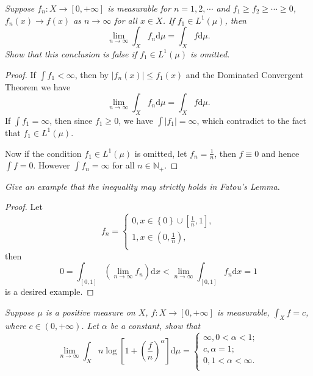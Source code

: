 \begin{problem}\em
Suppose $f_n:X\to [0,+\infty]$ is measurable for $n=1,2,\cdots$ and $f_1\ge f_2\ge\cdots\ge 0$, $f_n(x)\to f(x)$ as $n\to\infty$ for all $x\in X$. If $f_1\in L^1(\mu)$, then 
$$\lim_{n\to\infty}\int_Xf_n\mathrm{d}\mu=\int_Xf\mathrm{d}\mu.$$
Show that this conclusion is false if $f_1\in L^1(\mu)$ is omitted.
\end{problem}
\begin{proof}
If $\int f_1<\infty$, then by $|f_n(x)|\le f_1(x)$ and the Dominated Convergent Theorem we have 
$$\lim_{n\to\infty}\int_Xf_n\mathrm{d}\mu=\int_Xf\mathrm{d}\mu.$$
If $\int f_1=\infty$, then since $f_1\ge 0$, we have $\int|f_1|=\infty$, which contradict to the fact that $f_1\in L^1(\mu)$.\par
Now if the condition $f_1\in L^1(\mu)$ is omitted, let $f_n=\frac{1}{n}$, then $f\equiv 0$ and hence $\int f=0$. However $\int f_n=\infty$ for all $n\in\mathbb{N}_+$.
\end{proof}
\begin{problem}\em
Give an example that the inequality may strictly holds in Fatou's Lemma.
\end{problem}
\begin{proof}
Let 
$$
f_n=\begin{cases}
	0,x\in \left\{ 0 \right\} \cup \left[ \frac{1}{n},1 \right] ,\\
	1,x\in \left( 0,\frac{1}{n} \right) ,\\
\end{cases}
$$
then 
$$
0=\int_{\left[ 0,1 \right]}{\left( \lim_{n\rightarrow \infty} f_n \right) \mathrm{d}x}<\lim_{n\rightarrow \infty} \int_{\left[ 0,1 \right]}{f_n\mathrm{d}x}=1
$$
is a desired example.
\end{proof}
\begin{problem}\em
Suppose $\mu$ is a positive measure on $X$, $f:X\to [0,+\infty]$ is measurable, $\int_Xf=c$, where $c\in (0,+\infty)$. Let $\alpha$ be a constant, show that 
$$
\lim_{n\rightarrow \infty} \int_X{n\log \left[ 1+\left( \frac{f}{n} \right) ^{\alpha} \right] \mathrm{d}\mu}=\begin{cases}
	\infty ,0<\alpha <1;\\
	c,\alpha =1;\\
	0,1<\alpha <\infty .\\
\end{cases}
$$
\end{problem}

